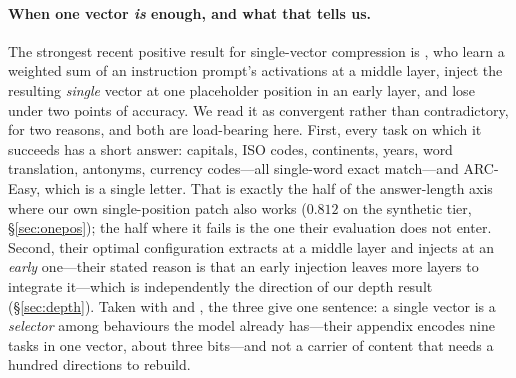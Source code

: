 \documentclass{article}
\begin{document}
\paragraph{When one vector \emph{is} enough, and what that tells us.}
The strongest recent positive result for single-vector compression is
\citet{ardoin2026promptcompression}, who learn a weighted sum of an instruction
prompt's activations at a middle layer, inject the resulting \emph{single}
vector at one placeholder position in an early layer, and lose under two points
of accuracy. We read it as convergent rather than contradictory, for two
reasons, and both are load-bearing here. First, every task on which it succeeds
has a short answer: capitals, ISO codes, continents, years, word translation,
antonyms, currency codes---all single-word exact match---and ARC-Easy, which is
a single letter. That is exactly the half of the answer-length axis where our
own single-position patch also works ($0.812$ on the synthetic tier,
\S\ref{sec:onepos}); the half where it fails is the one their evaluation does
not enter. Second, their optimal configuration extracts at a middle layer and
injects at an \emph{early} one---their stated reason is that an early injection
leaves more layers to integrate it---which is independently the direction of our
depth result (\S\ref{sec:depth}). Taken with \citet{dong2026taskvectorlimits}
and \citet{wiegreffe2025mcq}, the three give one sentence: a single vector is a
\emph{selector} among behaviours the model already has---their appendix encodes
nine tasks in one vector, about three bits---and not a carrier of content that
needs a hundred directions to rebuild.
\end{document}
